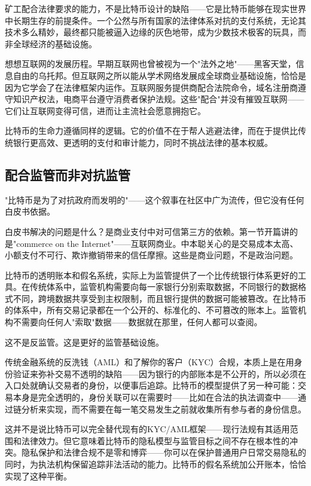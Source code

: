 \documentclass[a4paper,12pt,openany]{ctexbook}
\begin{document}
矿工配合法律要求的能力，不是比特币设计的缺陷——它是比特币能够在现实世界中长期生存的前提条件。一个公然与所有国家的法律体系对抗的支付系统，无论其技术多么精妙，最终都只能被逼入边缘的灰色地带，成为少数技术极客的玩具，而非全球经济的基础设施。

想想互联网的发展历程。早期互联网也曾被视为一个"法外之地"——黑客天堂，信息自由的乌托邦。但互联网之所以能从学术网络发展成全球商业基础设施，恰恰是因为它学会了在法律框架内运作。互联网服务提供商配合法院命令，域名注册商遵守知识产权法，电商平台遵守消费者保护法规。这些"配合"并没有摧毁互联网——它们让互联网变得可信，进而让主流社会愿意拥抱它。

比特币的生命力遵循同样的逻辑。它的价值不在于帮人逃避法律，而在于提供比传统银行更高效、更透明的支付和审计能力，同时不挑战法律的基本权威。


\subsection*{配合监管而非对抗监管}


"比特币是为了对抗政府而发明的"——这个叙事在社区中广为流传，但它没有任何白皮书依据。

白皮书解决的问题是什么？是商业支付中对可信第三方的依赖。第一节开篇讲的是"commerce on the Internet"——互联网商业。中本聪关心的是交易成本太高、小额支付不可行、欺诈撤销带来的信任摩擦。这些是商业问题，不是政治问题。

比特币的透明账本和假名系统，实际上为监管提供了一个比传统银行体系更好的工具。在传统体系中，监管机构需要向每一家银行分别索取数据，不同银行的数据格式不同，跨境数据共享受到主权限制，而且银行提供的数据可能被篡改。在比特币的体系中，所有交易记录都在一个公开的、标准化的、不可篡改的账本上。监管机构不需要向任何人"索取"数据——数据就在那里，任何人都可以查阅。

这不是反监管。这是更好的监管基础设施。

传统金融系统的反洗钱（AML）和了解你的客户（KYC）合规，本质上是在用身份验证来弥补交易不透明的缺陷——因为银行的内部账本是不公开的，所以必须在入口处就确认交易者的身份，以便事后追踪。比特币的模型提供了另一种可能：交易本身是完全透明的，身份关联可以在需要时——比如在合法的执法调查中——通过链分析来实现，而不需要在每一笔交易发生之前就收集所有参与者的身份信息。

这并不是说比特币可以完全替代现有的KYC/AML框架——现行法规有其适用范围和法律效力。但它意味着比特币的隐私模型与监管目标之间不存在根本性的冲突。隐私保护和法律合规不是零和博弈——你可以在保护普通用户日常交易隐私的同时，为执法机构保留追踪非法活动的能力。比特币的假名系统加公开账本，恰恰实现了这种平衡。
\end{document}
